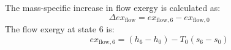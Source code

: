 The mass-specific increase in flow exergy is calculated as:  
\[
\Delta ex_{\text{flow}} = ex_{\text{flow},6} - ex_{\text{flow},0}
\]  
The flow exergy at state 6 is:  
\[
ex_{\text{flow},6} = (h_6 - h_0) - T_0 (s_6 - s_0)
\]